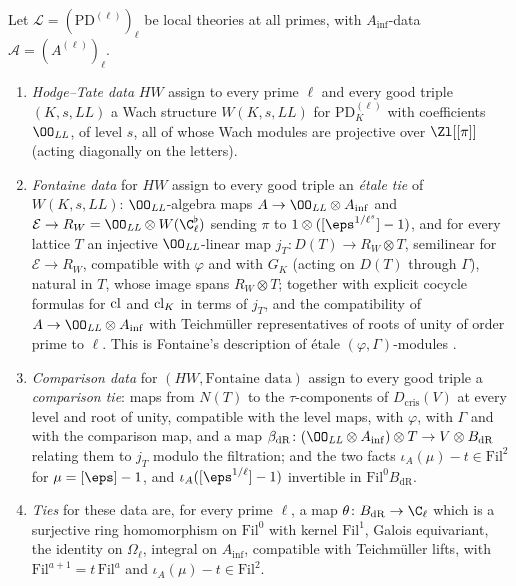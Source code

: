\begin{definition}\label{pf:sh-hodge:def-hw}
Let $\mathcal L=(\mathrm{PD}^{(\ell)})_\ell$ be local theories at all primes, with $A_{\inf}$-data $\mathcal A=(A^{(\ell)})_\ell$.
\begin{enumerate}[label=(\alph*)]
\item \emph{Hodge--Tate data} $HW$ assign to every prime $\ell$ and every good triple $(K,s,\mathit{LL})$ a Wach structure
  $W(K,s,\mathit{LL})$ for $\mathrm{PD}^{(\ell)}_K$ with coefficients $\OO_{\mathit{LL}}$, of level $s$, all of whose Wach modules are
  projective over $\Zl[[\pi]]$ (acting diagonally on the letters).
\item \emph{Fontaine data} for $HW$ assign to every good triple an \emph{\'etale tie} of $W(K,s,\mathit{LL})$: $\OO_{\mathit{LL}}$-algebra maps
  $A\to\OO_{\mathit{LL}}\otimes A_{\inf}$ and $\mathcal E\to R_W=\OO_{\mathit{LL}}\otimes W(\C_\ell^\flat)$ sending $\pi$ to
  $1\otimes([\eps^{1/\ell^s}]-1)$, and for every lattice $T$ an injective $\OO_{\mathit{LL}}$-linear map $j_T\colon D(T)\to R_W\otimes T$, semilinear
  for $\mathcal E\to R_W$, compatible with $\varphi$ and with $G_K$ (acting on $D(T)$ through $\Gamma$), natural in $T$, whose image spans
  $R_W\otimes T$; together with explicit cocycle formulas for $\operatorname{cl}$ and $\operatorname{cl}_K$ in terms of $j_T$, and the compatibility of
  $A\to\OO_{\mathit{LL}}\otimes A_{\inf}$ with Teichm\"uller representatives of roots of unity of order prime to $\ell$. This is Fontaine's
  description of \'etale $(\varphi,\Gamma)$-modules \cite{Fontaine1990}.
\item \emph{Comparison data} for $(HW,\text{Fontaine data})$ assign to every good triple a \emph{comparison tie}: maps from $N(T)$ to the
  $\tau$-components of $D_{\mathrm{cris}}(V)$ at every level and root of unity, compatible with the level maps, with $\varphi$, with $\Gamma$ and
  with the comparison map, and a map $\beta_{\mathrm{dR}}\colon(\OO_{\mathit{LL}}\otimes A_{\inf})\otimes T\to V\otimes B_{\mathrm{dR}}$
  relating them to $j_T$ modulo the filtration; and the two facts $\iota_A(\mu)-t\in\mathrm{Fil}^2$ for $\mu=[\eps]-1$, and
  $\iota_A([\eps^{1/\ell}]-1)$ invertible in $\mathrm{Fil}^0B_{\mathrm{dR}}$.
\item \emph{Ties} for these data are, for every prime $\ell$, a map $\theta\colon B_{\mathrm{dR}}\to\C_\ell$ which is a surjective ring
  homomorphism on $\mathrm{Fil}^0$ with kernel $\mathrm{Fil}^1$, Galois equivariant, the identity on $\Omega_\ell$, integral on $A_{\inf}$, compatible
  with Teichm\"uller lifts, with $\mathrm{Fil}^{a+1}=t\,\mathrm{Fil}^a$ and $\iota_A(\mu)-t\in\mathrm{Fil}^2$.
\end{enumerate}
\end{definition}

